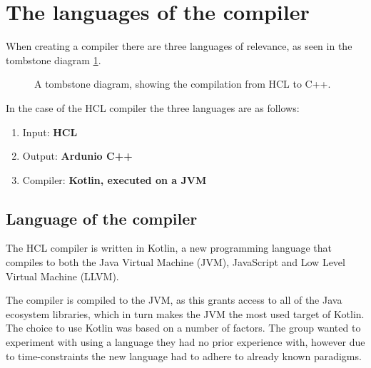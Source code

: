 \section{The languages of the compiler}
\label{langsOfCompiler}
When creating a compiler there are three languages of relevance, as seen in the tombstone diagram \ref{fig:TStoneOnlyHCL}.

\begin{figure}[H]
	\centering
	\caption{
		A tombstone diagram, showing the compilation from HCL to C++\cite{TStoneWiki}.
	}
	\label{fig:TStoneOnlyHCL}
\end{figure}
In the case of the HCL compiler the three languages are as follows:

\begin{enumerate}
\item Input: \textbf{HCL} \\
\item Output: \textbf{Ardunio C++} \\
\item Compiler: \textbf{Kotlin, executed on a JVM} \\
\end{enumerate}

\subsection{Language of the compiler}
The HCL compiler is written in Kotlin\cite{KotlinWebsite}, a new programming language that compiles to both the Java Virtual Machine (JVM), JavaScript and Low Level Virtual Machine (LLVM).

The compiler is compiled to the JVM, as this grants access to all of the Java ecosystem libraries, which in turn makes the JVM the most used target of Kotlin.
The choice to use Kotlin was based on a number of factors.
The group wanted to experiment with using a language they had no prior experience with, however due to time-constraints the new language had to adhere to already known paradigms.

